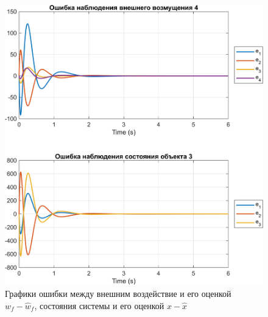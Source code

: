 \begin{figure}[H]
    \centering
    \includegraphics[width=\linewidth]{figs/22_sim.png}
    \caption{Графики ошибки между внешним воздействие и его оценкой $w_f-\hat w_f$,
    состояния системы и его оценкой $x-\hat x$}
    \label{fig:22}
\end{figure}

